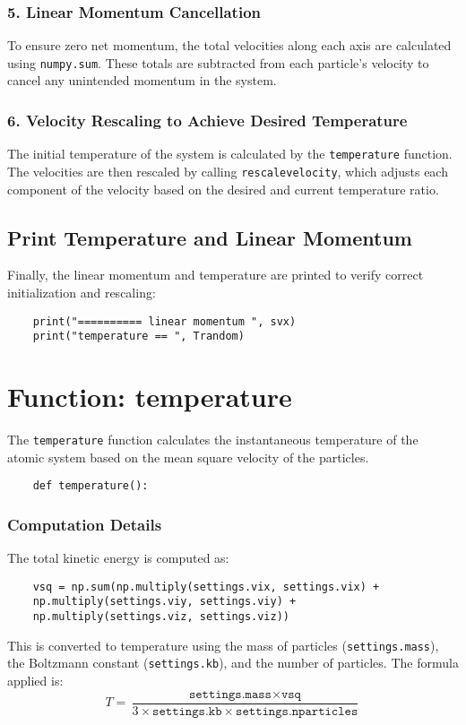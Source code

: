 \documentclass[12pt, ngerman]{report}
\begin{document}
\subsubsection*{5. Linear Momentum Cancellation}
To ensure zero net momentum, the total velocities along each axis are calculated using \texttt{numpy.sum}. These totals are subtracted from each particle’s velocity to cancel any unintended momentum in the system.

\subsubsection*{6. Velocity Rescaling to Achieve Desired Temperature}
The initial temperature of the system is calculated by the \texttt{temperature} function. The velocities are then rescaled by calling \texttt{rescalevelocity}, which adjusts each component of the velocity based on the desired and current temperature ratio.

\subsection{Print Temperature and Linear Momentum}
Finally, the linear momentum and temperature are printed to verify correct initialization and rescaling:
\begin{verbatim}
	print("========== linear momentum ", svx)
	print("temperature == ", Trandom)
\end{verbatim}

\section{Function: temperature}
\label{sec:temperature}

The \texttt{temperature} function calculates the instantaneous temperature of the atomic system based on the mean square velocity of the particles.

\begin{verbatim}
	def temperature():
\end{verbatim}

\subsubsection*{Computation Details}
The total kinetic energy is computed as:
\begin{verbatim}
	vsq = np.sum(np.multiply(settings.vix, settings.vix) + 
	np.multiply(settings.viy, settings.viy) + 
	np.multiply(settings.viz, settings.viz))
\end{verbatim}
This is converted to temperature using the mass of particles (\texttt{settings.mass}), the Boltzmann constant (\texttt{settings.kb}), and the number of particles. The formula applied is:
\[
T = \frac{\texttt{settings.mass} \times \texttt{vsq}}{3 \times \texttt{settings.kb} \times \texttt{settings.nparticles}}
\]
\end{document}
